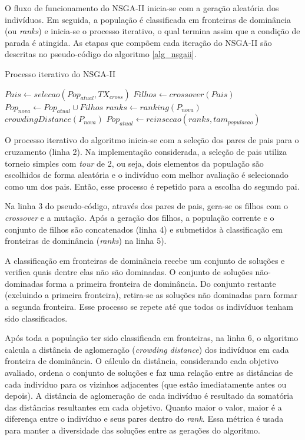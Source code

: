 O fluxo de funcionamento do NSGA-II inicia-se com a geração aleatória dos indivíduos. Em seguida, a população é classificada em fronteiras de dominância (ou \textit{ranks}) e inicia-se o processo iterativo, o qual termina assim que a condição de parada é atingida. As etapas que compõem cada iteração do NSGA-II são descritas no pseudo-código do algoritmo \ref{alg_nsgaii}.

\begin{algorithm}
	\caption{Processo iterativo do NSGA-II}
	\label{alg_nsgaii}
	\begin{algorithmic}[1]
		\State $Pais \gets selecao(Pop_{atual}, TX_{cross})$
		\State $Filhos \gets crossover(Pais)$
		\State $Pop_{nova} \gets Pop_{atual} \cup Filhos$
		\State $ranks \gets ranking(P_{nova})$
		\State $crowdingDistance(P_{nova})$
		\State $Pop_{atual} \gets reinsecao(ranks, tam_{populacao})$
		\EndWhile
	\end{algorithmic}
\end{algorithm}

O processo iterativo do algoritmo inicia-se com a seleção dos pares de pais para o cruzamento (linha 2). Na implementação considerada, a seleção de pais utiliza torneio simples com \textit{tour} de 2, ou seja, dois elementos da população são escolhidos de forma aleatória e o indivíduo com melhor avaliação é selecionado como um dos pais. Então, esse processo é repetido para a escolha do segundo pai.

Na linha 3 do pseudo-código, através dos pares de pais, gera-se os filhos com o \textit{crossover} e a mutação. Após a geração dos filhos, a população corrente e o conjunto de filhos são concatenados (linha 4) e submetidos à classificação em fronteiras de dominância (\textit{ranks}) na linha 5).

A classificação em fronteiras de dominância recebe um conjunto de soluções e verifica quais dentre elas não são dominadas. O conjunto de soluções não-dominadas forma a primeira fronteira de dominância. Do conjunto restante (excluindo a primeira fronteira), retira-se as soluções não dominadas para formar a segunda fronteira. Esse processo se repete até que todos os indivíduos tenham sido classificados.

Após toda a população ter sido classificada em fronteiras, na linha 6, o algoritmo calcula a distância de aglomeração (\textit{crowding distance}) dos indivíduos em cada fronteira de dominância. O cálculo da distância, considerando cada objetivo avaliado, ordena o conjunto de soluções e faz uma relação entre as distâncias de cada indivíduo para os vizinhos adjacentes (que estão imediatamente antes ou depois). A distância de aglomeração de cada indivíduo é resultado da somatória das distâncias resultantes em cada objetivo.  Quanto maior o valor, maior é a diferença entre o indivíduo e seus pares dentro do \textit{rank}. Essa métrica é usada para manter a diversidade das soluções entre as gerações do algoritmo.

